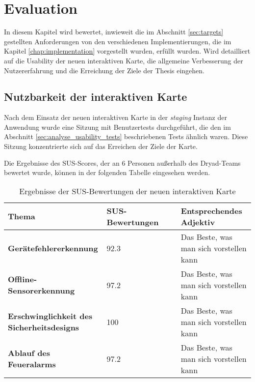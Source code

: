 \chapter{Evaluation}

In diesem Kapitel wird bewertet, inwieweit die im Abschnitt \ref{sec:targets} gestellten Anforderungen von den verschiedenen Implementierungen, die im Kapitel \ref{chap:implementation} vorgestellt wurden, erfüllt wurden.
Wird detailliert auf die Usability der neuen interaktiven Karte, die allgemeine Verbesserung der Nutzererfahrung und die Erreichung der Ziele der Thesis eingehen.

\section{Nutzbarkeit der interaktiven Karte}

Nach dem Einsatz der neuen interaktiven Karte in der \textit{staging} Instanz der Anwendung wurde eine Sitzung mit Benutzertests durchgeführt, die den im Abschnitt \ref{sec:analyse_usability_tests} beschriebenen Tests ähnlich waren.
Diese Sitzung konzentrierte sich auf das Erreichen der Ziele der Karte.

Die Ergebnisse des \ac{SUS}-Scores, der an 6 Personen außerhalb des Dryad-Teams bewertet wurde, können in der folgenden Tabelle eingesehen werden.

\begin{table}[H]
  \begin{tabular}{p{0.4\linewidth} |p{0.3\linewidth}|p{0.3\linewidth}}
    Thema                                             & \ac{SUS}-Bewertungen & Entsprechendes Adjektiv                 \\ \hline\hline

    \textbf{Gerätefehlererkennung}                    & 92.3                 & Das Beste, was man sich vorstellen kann \\\hline
    \textbf{Offline-Sensorerkennung}                  & 97.2                 & Das Beste, was man sich vorstellen kann \\\hline
    \textbf{Erschwinglichkeit des Sicherheitsdesigns} & 100                  & Das Beste, was man sich vorstellen kann \\\hline
    \textbf{Ablauf des Feueralarms}                   & 97.2                 & Das Beste, was man sich vorstellen kann
  \end{tabular}
  \caption{Ergebnisse der \ac{SUS}-Bewertungen der neuen interaktiven Karte}
\end{table}

